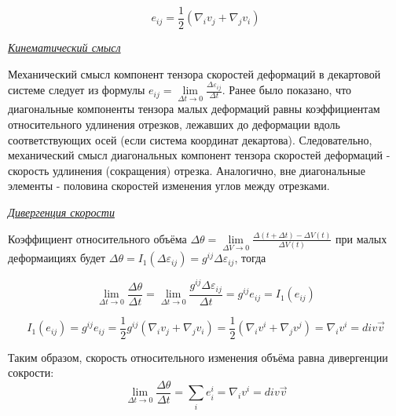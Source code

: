 $$e_{ij} = \frac{1}{2} \left(\nabla_{i}v_{j} + \nabla_{j}v_{i}\right)$$

\begin{center}
	\textit{\underline{Кинематический смысл}}
\end{center}
Механический смысл компонент тензора скоростей деформаций в декартовой системе следует из формулы $e_{ij} = \lim\limits_{\Delta t \rightarrow 0} \frac{\Delta \varepsilon_{ij}}{\Delta t}$. Ранее было показано, что диагональные компоненты тензора малых деформаций равны коэффициентам относительного удлинения отрезков, лежавших до деформации вдоль соответствующих осей (если система координат декартова). Следовательно, механический смысл диагональных компонент тензора скоростей деформаций - скорость удлинения (сокращения) отрезка. Аналогично, вне диагональные элементы - половина скоростей изменения углов между отрезками. 

\begin{center}
	\textit{\underline{Дивергенция скорости}}
\end{center}

Коэффициент относительного объёма
$ \Delta \theta = \lim\limits_{\Delta V \rightarrow 0} \frac {\Delta (t + \Delta t) - \Delta V(t)}{\Delta V(t)} $
при малых деформаициях будет $ \Delta \theta = I_1 (\Delta \varepsilon_{ij}) = g^{ij} \Delta \varepsilon_{ij} $, тогда

$$ \lim\limits_{\Delta t \rightarrow 0} \frac{\Delta \theta}{\Delta t} = \lim\limits_{\Delta t \rightarrow 0} \frac{g^{ij} \Delta \varepsilon_{ij}}{\Delta t} = g^{ij} e_{ij} = I_1 (e_{ij}) $$

$$ I_1 (e_{ij}) =  g^{ij} e_{ij} = \frac{1}{2} g^{ij} \left(\nabla_{i}v_{j} + \nabla_{j}v_{i}\right) = \frac{1}{2} \left(\nabla_{i}v^{i} + \nabla_{j}v^{j}\right) = \nabla_{i}v^{i} = div \overrightarrow{v}$$

Таким образом, скорость относительного изменения объёма равна дивергенции сокрости:
$$ \lim\limits_{\Delta t \rightarrow 0} \frac{\Delta \theta}{\Delta t} = \sum\limits_{i} e^{i}_{i} = \nabla_{i}v^{i} = div \overrightarrow{v}$$

